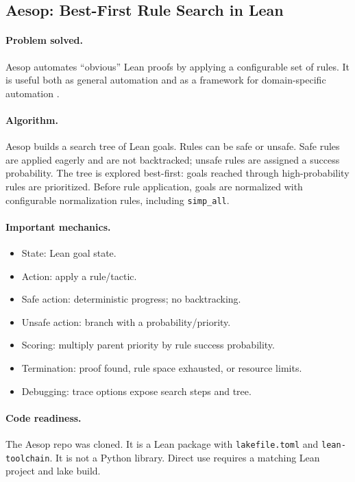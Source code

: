 \documentclass[11pt]{article}
\begin{document}
\subsection{Aesop: Best-First Rule Search in Lean}

\paragraph{Problem solved.}
Aesop automates ``obvious'' Lean proofs by applying a configurable set of rules.
It is useful both as general automation and as a framework for domain-specific
automation \cite{aesopgithub}.

\paragraph{Algorithm.}
Aesop builds a search tree of Lean goals. Rules can be safe or unsafe. Safe
rules are applied eagerly and are not backtracked; unsafe rules are assigned a
success probability. The tree is explored best-first: goals reached through
high-probability rules are prioritized. Before rule application, goals are
normalized with configurable normalization rules, including \texttt{simp\_all}.

\paragraph{Important mechanics.}

\begin{itemize}[leftmargin=*]
\item State: Lean goal state.
\item Action: apply a rule/tactic.
\item Safe action: deterministic progress; no backtracking.
\item Unsafe action: branch with a probability/priority.
\item Scoring: multiply parent priority by rule success probability.
\item Termination: proof found, rule space exhausted, or resource limits.
\item Debugging: trace options expose search steps and tree.
\end{itemize}

\paragraph{Code readiness.}
The Aesop repo was cloned. It is a Lean package with \texttt{lakefile.toml} and
\texttt{lean-toolchain}. It is not a Python library. Direct use requires a
matching Lean project and lake build.
\end{document}
